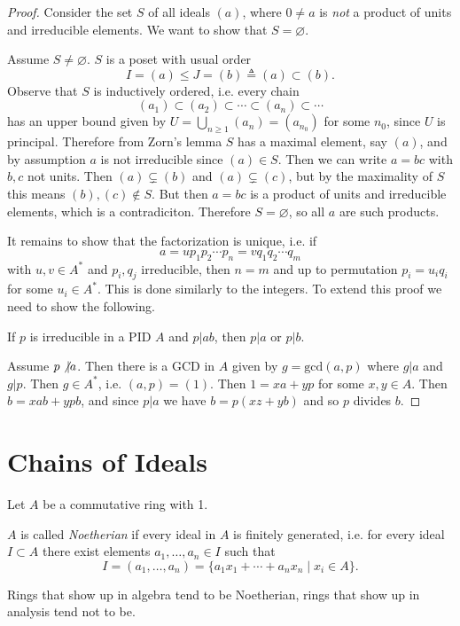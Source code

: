 \begin{proof}
Consider the set $S$ of all ideals $(a)$, where $0 \neq a$ is \emph{not} a
product of units and irreducible elements. We want to show that $S =
\varnothing$.

Assume $S \neq \varnothing$. $S$ is a poset with usual order
$$
I = (a) \leq J = (b) \triangleq (a) \subset (b).
$$
Observe that $S$ is inductively ordered, i.e. every chain
$$
(a_1) \subset (a_2) \subset \cdots \subset (a_n) \subset \cdots
$$
has an upper bound given by $U = \bigcup_{n \geq 1} (a_n) = (a_{n_0})$ for
some $n_0$, since $U$ is principal. Therefore from Zorn's lemma $S$ has a maximal
element, say $(a)$, and by assumption $a$ is not irreducible since
$(a) \in S$. Then we can write $a = bc$ with $b, c$ not units. Then
$(a) \subsetneq (b)$ and $(a) \subsetneq (c)$, but by the maximality
of $S$ this means $(b), (c) \notin S$. But then $a = bc$ is a product
of units and irreducible elements, which is a contradiciton. Therefore
$S = \varnothing$, so all $a$ are such products.

It remains to show that the factorization is unique, i.e. if
$$
a = u p_1 p_2 \cdots p_n = v q_1 q_2 \cdots q_m
$$
with $u, v \in A^\ast$ and $p_i, q_j$ irreducible, then $n = m$ and up
to permutation $p_i = u_i q_i$ for some $u_i \in A^\ast$. This is done
similarly to the integers. To extend this proof we need to show the
following.

\begin{lemma}
If $p$ is irreducible in a PID $A$ and $p \vert ab$, then $p \vert a$ or $p
\vert b$.
\end{lemma}

Assume $p \not\vert a$. Then there is a GCD in $A$ given by
$g = \mathrm{gcd}(a, p)$ where $g \vert a$ and $g \vert p$. Then
$g \in A^\ast$, i.e. $(a, p) = (1)$. Then $1 = xa + yp$ for some $x, y
\in A$. Then $b = xab + ypb$, and since $p \vert a$ we have
$b = p(xz + yb)$ and so $p$ divides $b$.
\end{proof}

\section{Chains of Ideals}
Let $A$ be a commutative ring with 1.
\begin{defn}
$A$ is called \emph{Noetherian} if every ideal in $A$ is finitely
generated, i.e. for every ideal $I \subset A$ there exist elements
$a_1, \dots, a_n \in I$ such that
$$
  I
= (a_1, \dots, a_n)
= \{ a_1 x_1 + \cdots + a_n x_n \mid x_i \in A \}.
$$

Rings that show up in algebra tend to be Noetherian, rings that show
up in analysis tend not to be.
\end{defn}

